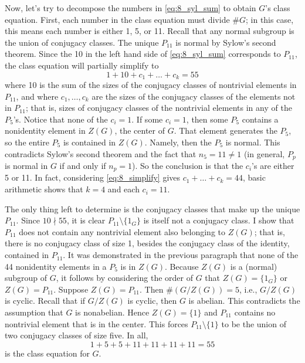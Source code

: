 \documentclass[12pt]{article}
\begin{document}
Now, let's try to decompose the numbers in \eqref{eq:8_syl_sum} to obtain $G$'s class equation. 
First, each number in the class equation must divide $\#G$; 
in this case, this means each number is either 1, 5, or 11. 
Recall that any normal subgroup is the union of conjugacy classes. 
The unique $P_{11}$ is normal by Sylow's second theorem. 
Since the 10 in the left hand side of \eqref{eq:8_syl_sum} corresponds to $P_{11}$, the class equation will partially simplify to 
\begin{equation} \label{eq:8_simplify}
  1 + 10 + c_1 + \ldots + c_k = 55
\end{equation}
where 10 is the sum of the sizes of the conjugacy classes of nontrivial elements in $P_{11}$, 
and where $c_1, \ldots, c_k$ are the sizes of the conjugacy classes of the elements not in $P_{11}$; 
that is, sizes of conjugacy classes of the nontrivial elements in any of the $P_5$'s. 
Notice that none of the $c_i = 1$. 
If some $c_i = 1$, then some $P_5$ contains a nonidentity element in $Z(G)$, the center of $G$. 
That element generates the $P_5$, so the entire $P_5$ is contained in $Z(G)$. 
Namely, then the $P_5$ is normal. 
This contradicts Sylow's second theorem and the fact that $n_5 = 11 \neq 1$  
(in general, $P_p$ is normal in $G$ if and only if $n_p = 1$). 
So the conclusion is that the $c_i$'s are either 5 or 11. 
In fact, considering \eqref{eq:8_simplify} gives $c_1 + \ldots + c_k = 44$, basic arithmetic shows that $k = 4$ and each $c_{i} = 11$. 

The only thing left to determine is the conjugacy classes that make up the unique $P_{11}$. 
Since $10 \nmid 55$, it is clear $P_{11} \setminus \{1_G\}$ is itself not a conjugacy class. 
I show that $P_{11}$ does not contain any nontrivial element also belonging to $Z(G)$; 
that is, there is no conjugacy class of size 1, besides the conjugacy class of the identity, contained in $P_{11}$.  
It was demonstrated in the previous paragraph that none of the 44 nonidentity elements in a $P_5$ is in $Z(G)$. 
Because $Z(G)$ is a (normal) subgroup of $G$, it follows by considering the order of $G$ that $Z(G) = \{1_G\}$ or $Z(G) = P_{11}$. 
Suppose $Z(G) = P_{11}$. 
Then $\#(G / Z(G)) = 5$, i.e., $G / Z(G)$ is cyclic. 
Recall that if $G / Z(G)$ is cyclic, then $G$ is abelian. 
This contradicts the assumption that $G$ is nonabelian. 
Hence $Z(G) = \{1\}$ and $P_{11}$ contains no nontrivial element that is in the center. 
This forces $P_{11} \setminus \{1\}$ to be the union of two conjugacy classes of size five. 
In all,  
$$1 + 5 + 5 + 11 + 11 + 11 + 11 = 55$$ 
is the class equation for $G$. 
\end{document}
